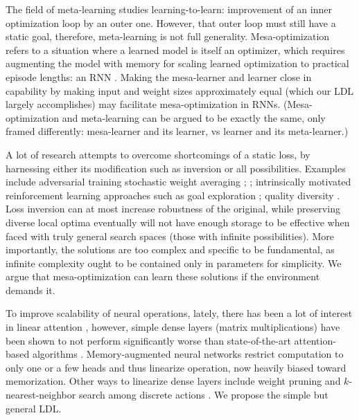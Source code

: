 \documentclass{article}
\begin{document}
The field of meta-learning studies learning-to-learn: improvement of an inner optimization loop by an outer one. However, that outer loop must still have a static goal, therefore, meta-learning is not full generality. Mesa-optimization \cite{hubinger2019risks} refers to a situation where a learned model is itself an optimizer, which requires augmenting the model with memory for scaling learned optimization to practical episode lengths: an RNN \cite{Ravi2017OptimizationAA}. Making the mesa-learner and learner close in capability by making input and weight sizes approximately equal (which our LDL largely accomplishes) may facilitate mesa-optimization in RNNs. (Mesa-optimization and meta-learning can be argued to be exactly the same, only framed differently: mesa-learner and its learner, vs learner and its meta-learner.)

A lot of research attempts to overcome shortcomings of a static loss, by harnessing either its modification such as inversion or all possibilities. Examples include adversarial training stochastic weight averaging \cite{izmailov2019averaging}; \cite{goodfellow2015explaining} \cite{du2021understanding}; intrinsically motivated reinforcement learning approaches \cite{6294131} such as goal exploration \cite{DBLP:journals/corr/abs-1708-02190}; quality diversity \cite{meyerson2017discovering} \cite{Gravina_2019} \cite{parkerholder2020effective}. Loss inversion can at most increase robustness of the original, while preserving diverse local optima eventually will not have enough storage to be effective when faced with truly general search spaces (those with infinite possibilities). More importantly, the solutions are too complex and specific to be fundamental, as infinite complexity ought to be contained only in parameters for simplicity. We argue that mesa-optimization can learn these solutions if the environment demands it.

To improve scalability of neural operations, lately, there has been a lot of interest in linear attention \cite{schlag2021linear}, however, simple dense layers (matrix multiplications) have been shown to not perform significantly worse than state-of-the-art attention-based algorithms \cite{tolstikhin2021mlpmixer}. Memory-augmented neural networks \cite{collier2019memoryaugmented} restrict computation to only one or a few heads and thus linearize operation, now heavily biased toward memorization. Other ways to linearize dense layers include weight pruning \cite{zhou2021effective} and $k$-nearest-neighbor search among discrete actions \cite{DBLP:journals/corr/Dulac-ArnoldESC15}. We propose the simple but general LDL.
\end{document}
